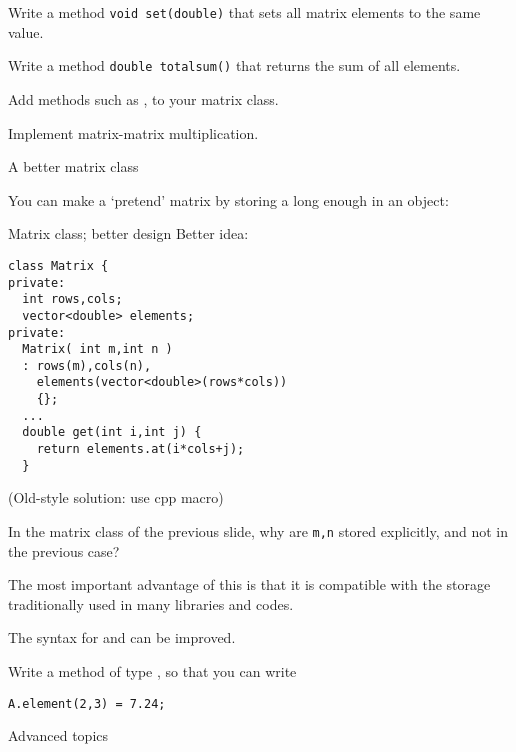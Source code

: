 \begin{exercise}
  \label{ex:matrix-set-sum}
  Write a method \lstinline+void set(double)+ that sets all
  matrix elements to the same value.

  Write a method \lstinline+double totalsum()+ that returns
  the sum of all elements.
\end{exercise}

\begin{exercise}
  \label{ex:matrix-methods}
  Add methods such as ,  to your matrix class.

  Implement matrix-matrix multiplication.
\end{exercise}

 {A better matrix class}

You can make a `pretend' matrix by storing a long enough  in
an object:
%

\begin{slide}{Matrix class; better design}
  \label{sl:matrix-class-cont}
  Better idea:
\begin{lstlisting}
class Matrix {
private:
  int rows,cols;
  vector<double> elements;
private:
  Matrix( int m,int n )
  : rows(m),cols(n),
    elements(vector<double>(rows*cols))
    {};
  ...
  double get(int i,int j) {
    return elements.at(i*cols+j);
  }
\end{lstlisting}
(Old-style solution: use cpp macro)
\end{slide}

\begin{exercise}
  \label{ex:matrixclass-rowcol2}
  In the matrix class of the previous slide,
  why are \lstinline{m,n} stored explicitly, and not in the
  previous case?
\end{exercise}

The most important advantage of this is that it is compatible with
the storage traditionally used in 
many libraries and codes.

The syntax for  and  can be improved.
\begin{exercise}
  Write a method  of type , so that you can write
\begin{lstlisting}
A.element(2,3) = 7.24;
\end{lstlisting}
\end{exercise}

 {Advanced topics}

